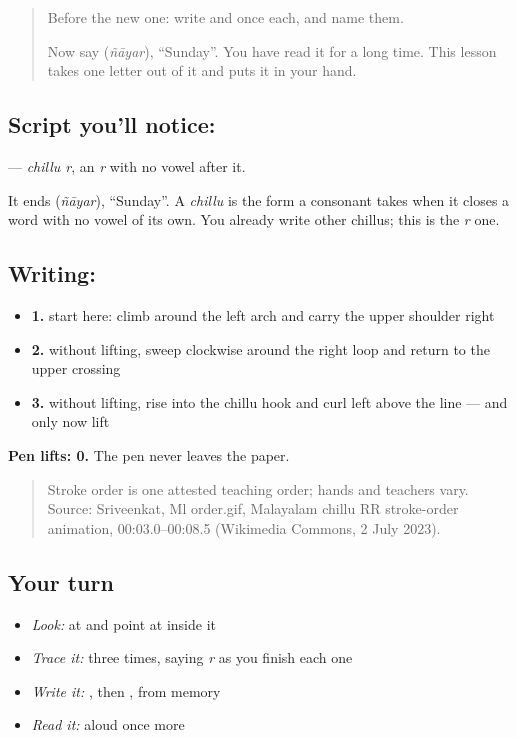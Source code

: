 \begin{quote}
Before the new one: write  and  once each, and name them.

Now say \textbf{} (\emph{ñāyar}), \textquotedblleft{}Sunday\textquotedblright{}. You have read it for a long time. This lesson takes one letter out of it and puts it in your hand.
\end{quote}

\subsection*{Script you'll notice: }
\textbf{} — \emph{chillu r}, an \emph{r} with no vowel after it.

It ends \textbf{} (\emph{ñāyar}), \textquotedblleft{}Sunday\textquotedblright{}. A \emph{chillu} is the form a consonant takes when it closes a word with no vowel of its own. You already write other chillus; this is the \emph{r} one.

\subsection*{Writing: }

\begin{itemize}
\raggedright
  \item \textbf{1.} start here: climb around the left arch and carry the upper shoulder right
  \item \textbf{2.} without lifting, sweep clockwise around the right loop and return to the upper crossing
  \item \textbf{3.} without lifting, rise into the chillu hook and curl left above the line — and only now lift
\end{itemize}

\textbf{Pen lifts: 0.} The pen never leaves the paper.

\begin{quote}
Stroke order is one attested teaching order; hands and teachers vary. Source: Sriveenkat, Ml  order.gif, Malayalam chillu RR stroke-order animation, 00:03.0–00:08.5 (Wikimedia Commons, 2 July 2023).
\end{quote}

\subsection*{Your turn}
\begin{itemize}
\raggedright
  \item \emph{Look:} at \textbf{} and point at  inside it
  \item \emph{Trace it:}  three times, saying \emph{r} as you finish each one
  \item \emph{Write it:} , then , from memory
  \item \emph{Read it:} \textbf{} aloud once more
\end{itemize}

